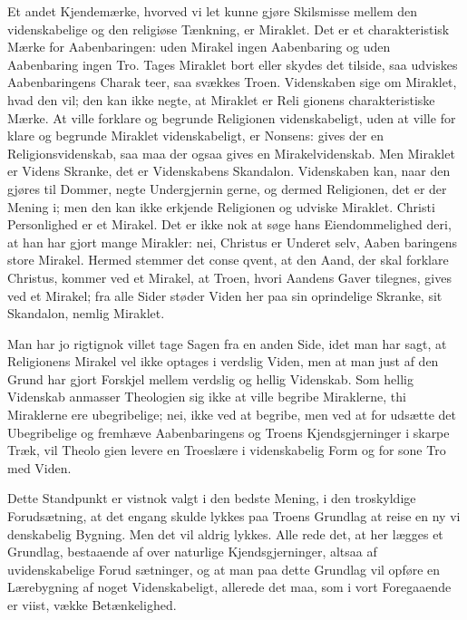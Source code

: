 \documentclass[12pt]{book}
\newcommand{\opage}[1]{\marginnote{\footnotesize\textit{[#1]}}}
\begin{document}
Et andet Kjendemærke, hvorved vi let kunne gjøre
Skilsmisse mellem den videnskabelige og den religiøse
Tænkning, er Miraklet. Det er et charakteristisk Mærke
for Aabenbaringen: uden Mirakel ingen Aabenbaring og
uden Aabenbaring ingen Tro. Tages Miraklet bort eller
skydes det tilside, saa udviskes Aabenbaringens Charak\-%
teer, saa svækkes Troen. Videnskaben sige om Miraklet,
hvad den vil; den kan ikke negte, at Miraklet er Reli\-%
gionens charakteristiske Mærke. At ville forklare og
begrunde Religionen videnskabeligt, uden at ville for\-%
klare og begrunde Miraklet videnskabeligt, er Nonsens:
gives der en Religionsvidenskab, saa maa der ogsaa
gives en Mirakelvidenskab. Men Miraklet er Videns
Skranke, det er Videnskabens Skandalon. Videnskaben
kan, naar den gjøres til Dommer, negte Undergjernin\-%
gerne, og dermed Religionen, det er der Mening i; men
den kan ikke erkjende Religionen og udviske Miraklet.
Christi Personlighed er et Mirakel. Det er ikke nok at
søge hans Eiendommelighed deri, at han har gjort
mange Mirakler: nei, Christus er Underet selv, Aaben\-%
baringens store Mirakel. Hermed stemmer det conse\-%
qvent, at den Aand, der skal forklare Christus, kommer
\opage{80}\setcounter{footnote}{0}%
ved et Mirakel, at Troen, hvori Aandens Gaver tilegnes,
gives ved et Mirakel; fra alle Sider støder Viden her
paa sin oprindelige Skranke, sit Skandalon, nemlig
Miraklet.

Man har jo rigtignok villet tage Sagen fra en anden
Side, idet man har sagt, at Religionens Mirakel vel ikke
optages i verdslig Viden, men at man just af den
Grund har gjort Forskjel mellem verdslig og hellig
Videnskab. Som hellig Videnskab anmasser Theologien
sig ikke at ville begribe Miraklerne, thi Miraklerne ere
ubegribelige; nei, ikke ved at begribe, men ved at for\-%
udsætte det Ubegribelige og fremhæve Aabenbaringens
og Troens Kjendsgjerninger i skarpe Træk, vil Theolo\-%
gien levere en Troeslære i videnskabelig Form og for\-%
sone Tro med Viden.

Dette Standpunkt er vistnok valgt i den bedste
Mening, i den troskyldige Forudsætning, at det engang
skulde lykkes paa Troens Grundlag at reise en ny vi\-%
denskabelig Bygning. Men det vil aldrig lykkes. Alle\-%
rede det, at her lægges et Grundlag, bestaaende af over\-%
naturlige Kjendsgjerninger, altsaa af uvidenskabelige Forud\-%
sætninger, og at man paa dette Grundlag vil opføre en
Lærebygning af noget Videnskabeligt, allerede det maa,
som i vort Foregaaende er viist, vække Betænkelighed.
\end{document}
